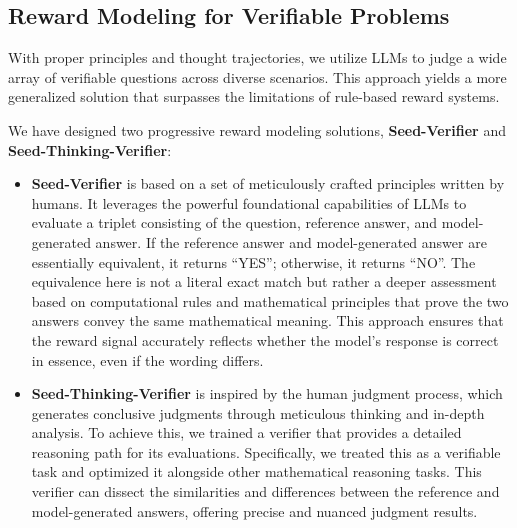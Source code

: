 \subsection{Reward Modeling for Verifiable Problems}
\label{sec: obj_reward_model}


With proper principles and thought trajectories, we utilize LLMs to judge a wide array of verifiable questions across diverse scenarios. This approach yields a more generalized solution that surpasses the limitations of rule-based reward systems.

We have designed two progressive reward modeling solutions, \textbf{Seed-Verifier} and \textbf{Seed-Thinking-Verifier}:
\begin{itemize}
    \item \textbf{Seed-Verifier} is based on a set of meticulously crafted principles written by humans. It leverages the powerful foundational capabilities of LLMs to evaluate a triplet consisting of the question, reference answer, and model-generated answer. If the reference answer and model-generated answer are essentially equivalent, it returns ``YES''; otherwise, it returns ``NO''. The equivalence here is not a literal exact match but rather a deeper assessment based on computational rules and mathematical principles that prove the two answers convey the same mathematical meaning. This approach ensures that the reward signal accurately reflects whether the model's response is correct in essence, even if the wording differs.
    \item \textbf{Seed-Thinking-Verifier} is inspired by the human judgment process, which generates conclusive judgments through meticulous thinking and in-depth analysis. To achieve this, we trained a verifier that provides a detailed reasoning path for its evaluations. Specifically, we treated this as a verifiable task and optimized it alongside other mathematical reasoning tasks. This verifier can dissect the similarities and differences between the reference and model-generated answers, offering precise and nuanced judgment results.
\end{itemize}

